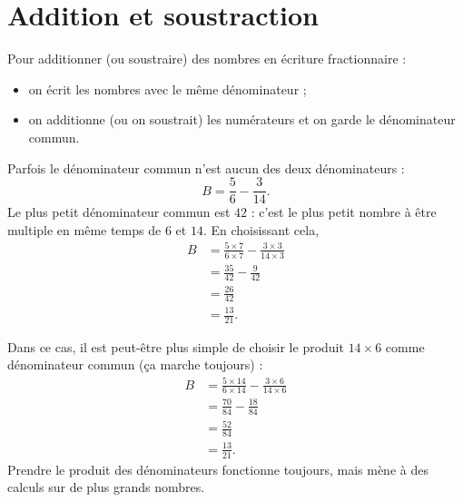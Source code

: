 


\section{Addition et soustraction}


\begin{Aretenir}
    Pour additionner (ou soustraire) des nombres en écriture fractionnaire :
    \begin{itemize}
        \item 
            on écrit les nombres avec le même dénominateur ;
        \item 
            on additionne (ou on soustrait) les numérateurs et on garde le dénominateur commun.
    \end{itemize}
\end{Aretenir}

\begin{example}
    Parfois le dénominateur commun n'est aucun des deux dénominateurs :
    \begin{equation}
        B=\frac{5}{ 6 }-\frac{ 3 }{ 14 }.
    \end{equation}
    Le plus petit dénominateur commun est \( 42\) : c'est le plus petit nombre à être multiple en même temps de \( 6\) et \( 14\). En choisissant cela,
    \begin{subequations}
        \begin{align}
            B&=\frac{ 5\times 7 }{ 6\times 7 }-\frac{ 3\times 3 }{ 14\times 3 }\\
            &=\frac{ 35 }{ 42 }-\frac{ 9 }{ 42 }\\
            &=\frac{ 26 }{ 42 }\\
            &=\frac{ 13 }{ 21 }.
        \end{align}
    \end{subequations}
    
    Dans ce cas, il est peut-être plus simple de choisir le produit \( 14\times 6\) comme dénominateur commun (ça marche toujours) :
    \begin{subequations}
        \begin{align}
            B&=\frac{ 5\times 14 }{ 6\times 14 }-\frac{ 3\times 6 }{ 14\times 6 }\\
            &=\frac{ 70 }{ 84 }-\frac{ 18 }{ 84 }\\
            &=\frac{ 52 }{ 84 }\\
            &=\frac{ 13 }{ 21 }.
        \end{align}
    \end{subequations}
    Prendre le produit des dénominateurs fonctionne toujours, mais mène à des calculs sur de plus grands nombres.    
\end{example}

